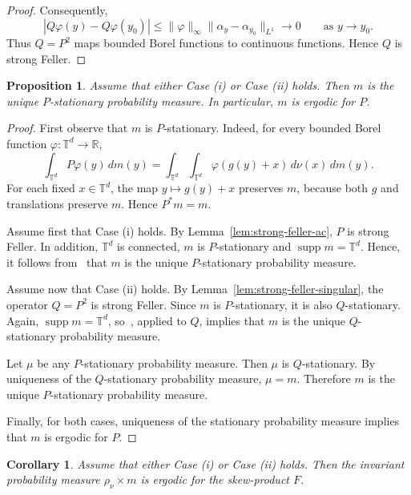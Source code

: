 \documentclass[a4paper,12pt,reqno]{amsart}
\numberwithin{equation}{section}
\newtheorem{proposition}[theorem]{Proposition}
\newtheorem{corollary}[theorem]{Corollary}
\newcommand{\Rr}{{\mathbb{R}}}
\newcommand{\Tt}{{\mathbb{T}}}
\begin{document}
\begin{proof}
Consequently,
\[
\left|Q\varphi(y)-Q\varphi(y_0)\right|
\leq
\|\varphi\|_\infty\|\alpha_y-\alpha_{y_0}\|_{L^1}
\longrightarrow 0
\qquad\text{as }y\to y_0.
\]
Thus $Q=P^2$ maps bounded Borel functions to continuous functions. Hence $Q$ is strong Feller.
\end{proof}

\begin{proposition}
\label{prop:unique-ergodicity-additive}
Assume that either Case (i) or Case (ii) holds. Then $m$ is the unique $P$-stationary probability measure. In particular, $m$ is ergodic for $P$.
\end{proposition}

\begin{proof}
First observe that $m$ is $P$-stationary. Indeed, for every bounded Borel function $\varphi\colon\Tt^d\to\Rr$,
\[
\int_{\Tt^d}P\varphi(y)\,dm(y)
=
\int_{\Tt^d}\int_{\Tt^d}\varphi(g(y)+x)\,d\nu(x)\,dm(y).
\]
For each fixed $x\in\Tt^d$, the map $y\mapsto g(y)+x$ preserves $m$, because both $g$ and translations preserve $m$. Hence $P^*m=m$.

Assume first that Case (i) holds. By Lemma~\ref{lem:strong-feller-ac}, $P$ is strong Feller. In addition, $\Tt^d$ is connected, $m$ is $P$-stationary and $\operatorname{supp}m=\Tt^d$. Hence, it follows from~\cite[Part (iii) of Proposition~5.18]{Benaim_2022} that $m$ is the unique $P$-stationary probability measure.

Assume now that Case (ii) holds. By Lemma~\ref{lem:strong-feller-singular}, the operator $Q=P^2$ is strong Feller. Since $m$ is $P$-stationary, it is also $Q$-stationary. Again, $\operatorname{supp}m=\Tt^d$, so~\cite[Part (iii) of Proposition~5.18]{Benaim_2022}, applied to $Q$, implies that $m$ is the unique $Q$-stationary probability measure.

Let $\mu$ be any $P$-stationary probability measure. Then $\mu$ is $Q$-stationary.  By uniqueness of the $Q$-stationary probability measure, $\mu=m$. Therefore $m$ is the unique $P$-stationary probability measure.

Finally, for both cases, uniqueness of the stationary probability measure implies that $m$ is ergodic for $P$.
\end{proof}

\begin{corollary}
\label{cor:skew-product-ergodicity}
Assume that either Case (i) or Case (ii) holds. Then the invariant probability measure $\rho_\nu\times m$ is ergodic for the skew-product $F$.
\end{corollary}
\end{document}
